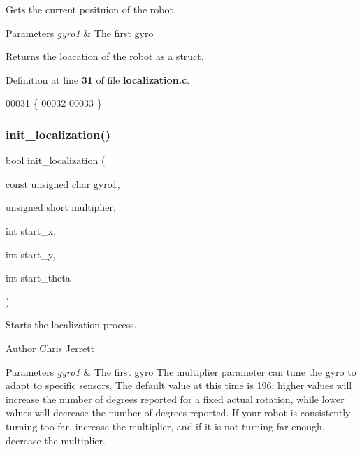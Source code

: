 Gets the current posituion of the robot. 


\begin{DoxyParams}{Parameters}
{\em gyro1} & The first gyro \\
\hline
\end{DoxyParams}
\begin{DoxyReturn}{Returns}
the loacation of the robot as a struct. 
\end{DoxyReturn}


Definition at line \textbf{ 31} of file \textbf{ localization.\+c}.


\begin{DoxyCode}
00031                                \{
00032 
00033 \}
\end{DoxyCode}
\mbox{\label{localization_8c_afdd0147de6aa15957e9a125f9cd20578}} 
\subsubsection{init\+\_\+localization()}
{\footnotesize\ttfamily bool init\+\_\+localization (\begin{DoxyParamCaption}\item[{const unsigned char}]{gyro1,  }\item[{unsigned short}]{multiplier,  }\item[{int}]{start\+\_\+x,  }\item[{int}]{start\+\_\+y,  }\item[{int}]{start\+\_\+theta }\end{DoxyParamCaption})}



Starts the localization process. 

\begin{DoxyAuthor}{Author}
Chris Jerrett
\end{DoxyAuthor}

\begin{DoxyParams}{Parameters}
{\em gyro1} & The first gyro  The multiplier parameter can tune the gyro to adapt to specific sensors. The default value at this time is 196; higher values will increase the number of degrees reported for a fixed actual rotation, while lower values will decrease the number of degrees reported. If your robot is consistently turning too far, increase the multiplier, and if it is not turning far enough, decrease the multiplier. \\
\hline
\end{DoxyParams}


